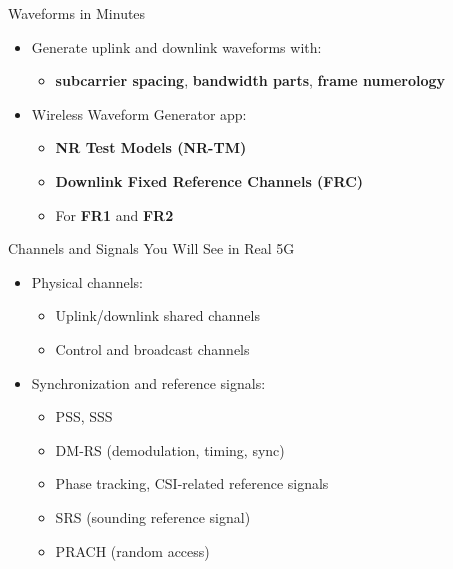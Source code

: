 \begin{frame}{Waveforms in Minutes}
\begin{itemize}
  \item Generate uplink and downlink waveforms with:
  \begin{itemize}
    \item \textbf{subcarrier spacing}, \textbf{bandwidth parts}, \textbf{frame numerology}
  \end{itemize}
  \item Wireless Waveform Generator app:
  \begin{itemize}
    \item \textbf{NR Test Models (NR-TM)}
    \item \textbf{Downlink Fixed Reference Channels (FRC)}
    \item For \textbf{FR1} and \textbf{FR2}
  \end{itemize}
\end{itemize}
\end{frame}

\begin{frame}{Channels and Signals You Will See in Real 5G}

\begin{itemize}
  \item Physical channels:
  \begin{itemize}
    \item Uplink/downlink shared channels
    \item Control and broadcast channels
  \end{itemize}
  \item Synchronization and reference signals:
  \begin{itemize}
    \item PSS, SSS
    \item DM-RS (demodulation, timing, sync)
    \item Phase tracking, CSI-related reference signals
    \item SRS (sounding reference signal)
    \item PRACH (random access)
  \end{itemize}
\end{itemize}
\end{frame}

